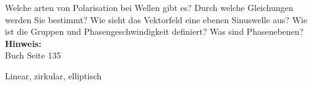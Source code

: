 \begin{question}[section=5,subsection=52,name={Poleristaion von Wellen},difficulty=6,type=mdl,tags={}]
	Welche arten von Polarisation bei Wellen gibt es? Durch welche Gleichungen werden Sie bestimmt? Wie sieht das Vektorfeld eine ebenen Sinuswelle aus? Wie ist die Gruppen und Phasengeschwindigkeit definiert? Was sind Phasenebenen?
	\\ \textbf{Hinweis:}\\
	Buch Seite 135
\end{question}
\begin{solution}
	Linear, zirkular, elliptisch
\end{solution}